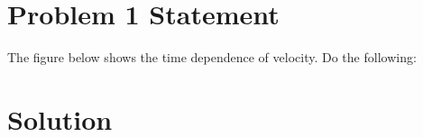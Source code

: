 \documentclass{article}
\begin{document}


\section*{Problem 1 Statement}
The figure below shows the time dependence of velocity. Do the following:



\section*{Solution}
\end{document}
